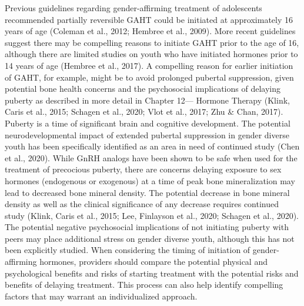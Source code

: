 \documentclass[
]{book}
\begin{document}
Previous guidelines regarding gender-affirming
treatment of adolescents recommended partially
reversible GAHT could be initiated at approximately 16 years of age (Coleman et al., 2012;
Hembree et al., 2009). More recent guidelines
suggest there may be compelling reasons to initiate GAHT prior to the age of 16, although
there are limited studies on youth who have
initiated hormones prior to 14 years of age
(Hembree et al., 2017). A compelling reason for
earlier initiation of GAHT, for example, might
be to avoid prolonged pubertal suppression,
given potential bone health concerns and the
psychosocial implications of delaying puberty as
described in more detail in Chapter 12---
Hormone Therapy (Klink, Caris et al., 2015;
Schagen et al., 2020; Vlot et al., 2017; Zhu \&
Chan, 2017). Puberty is a time of significant
brain and cognitive development. The potential
neurodevelopmental impact of extended pubertal
suppression in gender diverse youth has been
specifically identified as an area in need of continued study (Chen et al., 2020). While GnRH
analogs have been shown to be safe when used
for the treatment of precocious puberty, there
are concerns delaying exposure to sex hormones
(endogenous or exogenous) at a time of peak
bone mineralization may lead to decreased bone
mineral density. The potential decrease in bone
mineral density as well as the clinical significance of any decrease requires continued study
(Klink, Caris et al., 2015; Lee, Finlayson et al.,
2020; Schagen et al., 2020). The potential negative psychosocial implications of not initiating
puberty with peers may place additional stress
on gender diverse youth, although this has not
been explicitly studied. When considering the
timing of initiation of gender-affirming hormones, providers should compare the potential
physical and psychological benefits and risks of
starting treatment with the potential risks and
benefits of delaying treatment. This process can
also help identify compelling factors that may
warrant an individualized approach.
\end{document}
